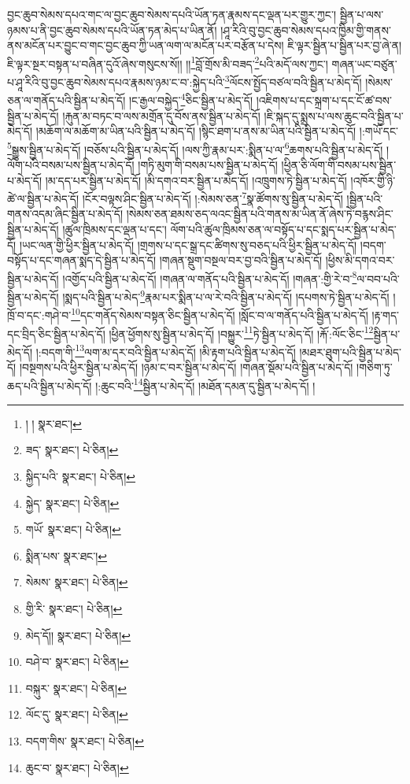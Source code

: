 བྱང་ཆུབ་སེམས་དཔའ་གང་ལ་བྱང་ཆུབ་སེམས་དཔའི་ཡོན་ཏན་རྣམས་དང་ལྡན་པར་གྱུར་ཀྱང་། སྦྱིན་པ་ལས་ཉམས་པ་ནི་བྱང་ཆུབ་སེམས་དཔའི་ཡོན་ཏན་མེད་པ་ཡིན་ནོ། །ཤཱ་རིའི་བུ་བྱང་ཆུབ་སེམས་དཔའ་ཁྱིམ་གྱི་གནས་ནས་མངོན་པར་བྱུང་བ་གང་བྱང་ཆུབ་ཀྱི་ཡན་ལག་ལ་མངོན་པར་བརྩོན་པ་དེས། ཇི་ལྟར་སྦྱིན་པ་སྦྱིན་པར་བྱ་ཞེ་ན། ཇི་ལྟར་སྔར་བསྟན་པ་བཞིན་དུའོ་ཞེས་གསུངས་སོ།། །།\footnote{། །  སྣར་ཐང་། }བློ་གྲོས་མི་བཟད་\footnote{ཟད་  སྣར་ཐང་།  པེ་ཅིན། }པའི་མདོ་ལས་ཀྱང་། གཞན་ཡང་བཙུན་པ་ཤཱ་རིའི་བུ་བྱང་ཆུབ་སེམས་དཔའ་རྣམས་ཉམ་ང་བ་:སྐྱེད་པའི་\footnote{སྐྱིད་པའི་  སྣར་ཐང་།  པེ་ཅིན། }ལོངས་སྤྱོད་བཙལ་བའི་སྦྱིན་པ་མེད་དོ། །སེམས་ཅན་ལ་གནོད་པའི་སྦྱིན་པ་མེད་དོ། །ང་རྒྱལ་བསྐྱེད་\footnote{སྐྱེད་  སྣར་ཐང་།  པེ་ཅིན། }ཅིང་སྦྱིན་པ་མེད་དོ། །འཇིགས་པ་དང་སྐྲག་པ་དང་ངོ་ཚ་བས་སྦྱིན་པ་མེད་དོ། །རྐུན་མ་བཏང་བ་ལས་མགྲོན་དུ་བོས་ནས་སྦྱིན་པ་མེད་དོ། །ཇི་སྐད་དུ་སྨྲས་པ་ལས་ཆུང་བའི་སྦྱིན་པ་མེད་དོ། །མཆོག་ལ་མཆོག་མ་ཡིན་པའི་སྦྱིན་པ་མེད་དོ། །སྙིང་ཐག་པ་ནས་མ་ཡིན་པའི་སྦྱིན་པ་མེད་དོ། །:གཡོ་དང་\footnote{གཡོ་  སྣར་ཐང་།  པེ་ཅིན། }སྒྱུས་སྦྱིན་པ་མེད་དོ། །བཅོས་པའི་སྦྱིན་པ་མེད་དོ། །ལས་ཀྱི་རྣམ་པར་:སྨིན་པ་ལ་\footnote{སྨིན་པས་  སྣར་ཐང་། }ཆགས་པའི་སྦྱིན་པ་མེད་དོ། །ལོག་པའི་བསམ་པས་སྦྱིན་པ་མེད་དོ། །གཏི་མུག་གི་བསམ་པས་སྦྱིན་པ་མེད་དོ། །ཕྱིན་ཅི་ལོག་གི་བསམ་པས་སྦྱིན་པ་མེད་དོ། །མ་དད་པར་སྦྱིན་པ་མེད་དོ། །མི་དགའ་བར་སྦྱིན་པ་མེད་དོ། །འཁྲུགས་ཏེ་སྦྱིན་པ་མེད་དོ། །འཁོར་གྱི་ཉི་ཚེ་ལ་སྦྱིན་པ་མེད་དོ། །ངོར་བལྟས་ཤིང་སྦྱིན་པ་མེད་དོ། །:སེམས་ཅན་\footnote{སེམས་  སྣར་ཐང་།  པེ་ཅིན། }སྣ་ཚོགས་སུ་སྦྱིན་པ་མེད་དོ། །སྦྱིན་པའི་གནས་འདམ་ཞིང་སྦྱིན་པ་མེད་དོ། །སེམས་ཅན་ཐམས་ཅད་ལའང་སྦྱིན་པའི་གནས་མ་ཡིན་ནོ་ཞེས་ཏེ་བརྙས་ཤིང་སྦྱིན་པ་མེད་དོ། །ཚུལ་ཁྲིམས་དང་ལྡན་པ་དང་། ལོག་པའི་ཚུལ་ཁྲིམས་ཅན་ལ་བསྟོད་པ་དང་སྨད་པར་སྦྱིན་པ་མེད་དོ། །ཡང་ལན་གྱི་ཕྱིར་སྦྱིན་པ་མེད་དོ། །གྲགས་པ་དང་སྒྲ་དང་ཚིགས་སུ་བཅད་པའི་ཕྱིར་སྦྱིན་པ་མེད་དོ། །བདག་བསྟོད་པ་དང་གཞན་སྨད་དེ་སྦྱིན་པ་མེད་དོ། །གཞན་སྡུག་བསྔལ་བར་བྱ་བའི་སྦྱིན་པ་མེད་དོ། །ཕྱིས་མི་དགའ་བར་སྦྱིན་པ་མེད་དོ། །འགྱོད་པའི་སྦྱིན་པ་མེད་དོ། །གཞན་ལ་གནོད་པའི་སྦྱིན་པ་མེད་དོ། །གཞན་:གྱི་རེ་བ་\footnote{གྱི་རི་  སྣར་ཐང་།  པེ་ཅིན། }ལ་བབ་པའི་སྦྱིན་པ་མེད་དོ། །སྨད་པའི་སྦྱིན་པ་མེད་\footnote{མེད་དོ།།  སྣར་ཐང་།  པེ་ཅིན། }རྣམ་པར་སྨིན་པ་ལ་རེ་བའི་སྦྱིན་པ་མེད་དོ། །དཔགས་ཏེ་སྦྱིན་པ་མེད་དོ། །ཁྲོ་བ་དང་:གཤེ་བ་\footnote{བཤེ་བ་  སྣར་ཐང་།  པེ་ཅིན། }དང་གནོད་སེམས་བསྟན་ཅིང་སྦྱིན་པ་མེད་དོ། །སློང་བ་ལ་གནོད་པའི་སྦྱིན་པ་མེད་དོ། །རྟ་གད་དང་བྲིད་ཅིང་སྦྱིན་པ་མེད་དོ། །ཕྱིན་ཕྱོགས་སུ་སྦྱིན་པ་མེད་དོ། །བསྐྱུར་\footnote{བསྐུར་  སྣར་ཐང་།  པེ་ཅིན། }ཏེ་སྦྱིན་པ་མེད་དོ། །རྐོ་:ལོང་ཅིང་\footnote{ལོང་དུ་  སྣར་ཐང་།  པེ་ཅིན། }སྦྱིན་པ་མེད་དོ། །:བདག་གི་\footnote{བདག་གིས་  སྣར་ཐང་།  པེ་ཅིན། }ལག་མ་དར་བའི་སྦྱིན་པ་མེད་དོ། །མི་རྟག་པའི་སྦྱིན་པ་མེད་དོ། །མཐར་ཐུག་པའི་སྦྱིན་པ་མེད་དོ། །བསྔགས་པའི་ཕྱིར་སྦྱིན་པ་མེད་དོ། །ཉམ་ང་བར་སྦྱིན་པ་མེད་དོ། །གཞན་སྡོམ་པའི་སྦྱིན་པ་མེད་དོ། །གཅིག་ཏུ་ཆད་པའི་སྦྱིན་པ་མེད་དོ། །:ཆུང་བའི་\footnote{ཆུང་བ་  སྣར་ཐང་།  པེ་ཅིན། }སྦྱིན་པ་མེད་དོ། །མཐོན་དམན་དུ་སྦྱིན་པ་མེད་དོ། །
